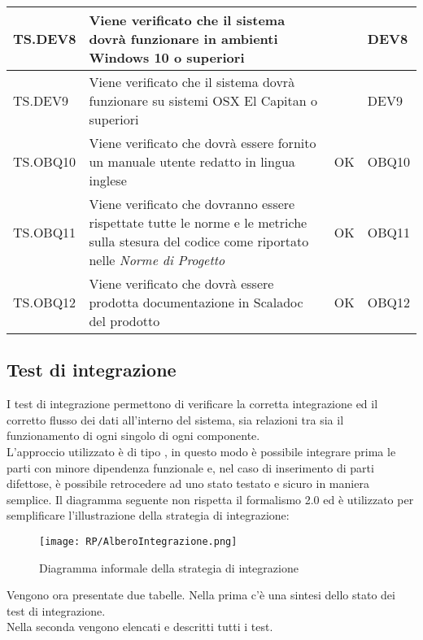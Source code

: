 \documentclass{scalatekids-article}
\begin{document}
\begin{center}
\begin{longtable}[H]{| l | p{10cm} | l | l |}
    \hline
    TS.DEV8 & Viene verificato che il sistema dovrà funzionare in ambienti Windows 10 o superiori & & DEV8\\
    \hline
    TS.DEV9 & Viene verificato che il sistema dovrà funzionare su sistemi OSX El Capitan o superiori & & DEV9\\
    \hline
    TS.OBQ10 & Viene verificato che dovrà essere fornito un manuale utente redatto in lingua inglese & OK & OBQ10\\
    \hline
    TS.OBQ11 & Viene verificato che dovranno essere rispettate tutte le norme e le metriche sulla stesura del codice come riportato nelle \textit{Norme di Progetto} & OK & OBQ11\\
    \hline
    TS.OBQ12 & Viene verificato che dovrà essere prodotta documentazione in Scaladoc del prodotto & OK & OBQ12\\
    \hline
  \end{longtable}
\end{center}

\subsection{Test di integrazione}

I test di integrazione permettono di verificare la corretta integrazione ed il
corretto flusso dei dati all'interno del sistema, sia relazioni tra
 sia il funzionamento
di ogni singolo  di ogni componente.\\
L'approccio utilizzato è di tipo , in questo modo è possibile
integrare prima le parti con minore dipendenza funzionale e, nel caso di
inserimento di parti difettose, è possibile retrocedere ad uno stato testato e
sicuro in maniera semplice. Il diagramma seguente non rispetta il formalismo
 2.0 ed è utilizzato per semplificare l'illustrazione della strategia
di integrazione:
\begin{figure}[H]
  \begin{center}
    \texttt{[image: RP/AlberoIntegrazione.png]}
    \caption{Diagramma informale della strategia di integrazione}
  \end{center}
\end{figure}

Vengono ora presentate due tabelle. Nella prima c'è una sintesi dello stato 
dei test di integrazione.\\Nella seconda vengono elencati e descritti tutti i 
test.
\end{document}
